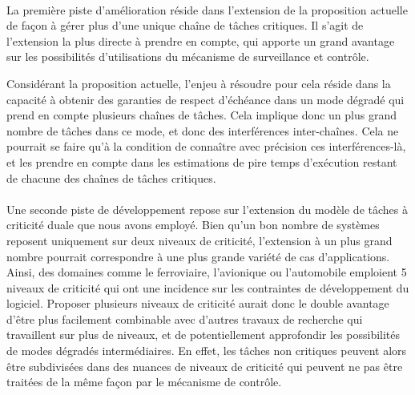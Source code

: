 \documentclass[a4paper,11pt,twoside]{StyleThese}
\begin{document}
\paragraph*{} La première piste d'amélioration réside dans l'extension de la proposition actuelle de façon à gérer plus d'une unique chaîne de tâches critiques. Il s'agit de l'extension la plus directe à prendre en compte, qui apporte un grand avantage sur les possibilités d'utilisations du mécanisme de surveillance et contrôle. 

Considérant la proposition actuelle, l'enjeu à résoudre pour cela réside dans la capacité à obtenir des garanties de respect d'échéance dans un mode dégradé qui prend en compte plusieurs chaînes de tâches. Cela implique donc un plus grand nombre de tâches dans ce mode, et donc des interférences inter-chaînes. Cela ne pourrait se faire qu'à la condition de connaître avec précision ces interférences-là, et les prendre en compte dans les estimations de pire temps d'exécution restant de chacune des chaînes de tâches critiques.

\paragraph*{} Une seconde piste de développement repose sur l'extension du modèle de tâches à criticité duale que nous avons employé. Bien qu'un bon nombre de systèmes reposent uniquement sur deux niveaux de criticité, l’extension à un plus grand nombre pourrait correspondre à une plus grande variété de cas d'applications. Ainsi, des domaines comme le ferroviaire, l'avionique ou l'automobile emploient 5 niveaux de criticité qui ont une incidence sur les contraintes de développement du logiciel. Proposer plusieurs niveaux de criticité aurait donc le double avantage d'être plus facilement combinable avec d'autres travaux de recherche qui travaillent sur plus de niveaux, et de potentiellement approfondir les possibilités de modes dégradés intermédiaires. En effet, les tâches non critiques peuvent alors être subdivisées dans des nuances de niveaux de criticité qui peuvent ne pas être traitées de la même façon par le mécanisme de contrôle.
\end{document}
